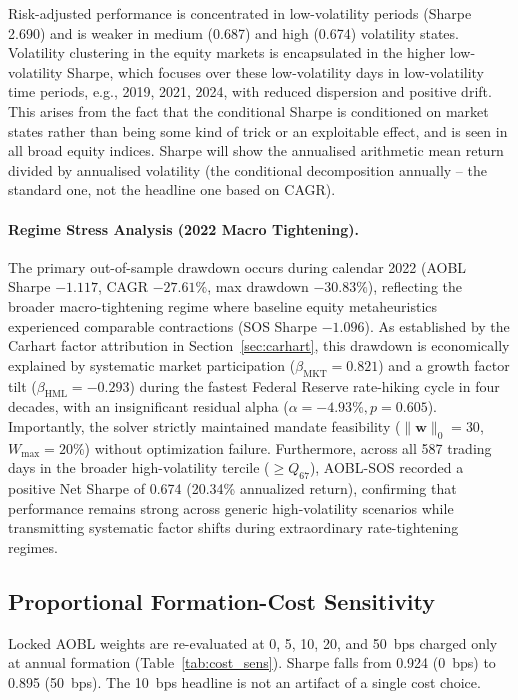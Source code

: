 \documentclass[11pt,a4paper]{article}
\begin{document}
Risk-adjusted performance is concentrated in low-volatility periods (Sharpe 2.690) and is weaker in medium (0.687) and high (0.674) volatility states. Volatility clustering in the equity markets is encapsulated in the higher low-volatility Sharpe, which focuses over these low-volatility days in low-volatility time periods, e.g., 2019, 2021, 2024, with reduced dispersion and positive drift. This arises from the fact that the conditional Sharpe is conditioned on market states rather than being some kind of trick or an exploitable effect, and is seen in all broad equity indices. Sharpe will show the annualised arithmetic mean return divided by annualised volatility (the conditional decomposition annually – the standard one, not the headline one based on CAGR).

\paragraph{Regime Stress Analysis (2022 Macro Tightening).}
The primary out-of-sample drawdown occurs during calendar 2022 (AOBL Sharpe $-1.117$, CAGR $-27.61\%$, max drawdown $-30.83\%$), reflecting the broader macro-tightening regime where baseline equity metaheuristics experienced comparable contractions (SOS Sharpe $-1.096$). As established by the Carhart factor attribution in Section~\ref{sec:carhart}, this drawdown is economically explained by systematic market participation ($\beta_{\text{MKT}}=0.821$) and a growth factor tilt ($\beta_{\text{HML}}=-0.293$) during the fastest Federal Reserve rate-hiking cycle in four decades, with an insignificant residual alpha ($\alpha = -4.93\%, p=0.605$). Importantly, the solver strictly maintained mandate feasibility ($\|\mathbf{w}\|_0=30$, $W_{\max}=20\%$) without optimization failure. Furthermore, across all 587 trading days in the broader high-volatility tercile ($\ge Q_{67}$), AOBL-SOS recorded a positive Net Sharpe of 0.674 (20.34\% annualized return), confirming that performance remains strong across generic high-volatility scenarios while transmitting systematic factor shifts during extraordinary rate-tightening regimes.

\subsection{Proportional Formation-Cost Sensitivity}
Locked AOBL weights are re-evaluated at 0, 5, 10, 20, and 50~bps charged only at annual formation (Table~\ref{tab:cost_sens}). Sharpe falls from 0.924 (0~bps) to 0.895 (50~bps). The 10~bps headline is not an artifact of a single cost choice.
\end{document}
